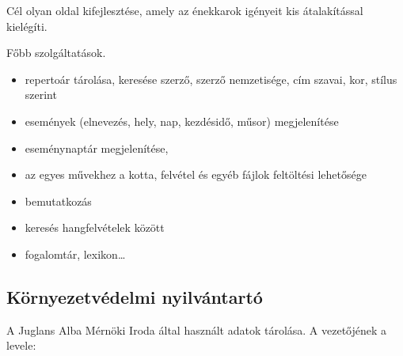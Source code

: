 \documentclass[a4paper]{article}
\begin{document}
Cél olyan oldal kifejlesztése, amely az énekkarok igényeit kis
átalakítással kielégíti.

Főbb szolgáltatások.

\begin{itemize}
    \item repertoár tárolása, keresése szerző, szerző nemzetisége, cím szavai, kor, stílus szerint
    \item események (elnevezés, hely, nap, kezdésidő, műsor) megjelenítése
    \item eseménynaptár megjelenítése,
    \item az egyes művekhez a kotta, felvétel és egyéb fájlok feltöltési
	lehetősége
    \item bemutatkozás
    \item keresés hangfelvételek között
    \item fogalomtár, lexikon\ldots
\end{itemize}

\subsection{Környezetvédelmi nyilvántartó}

A Juglans Alba Mérnöki Iroda által használt adatok tárolása. A
vezetőjének a levele:
\end{document}
